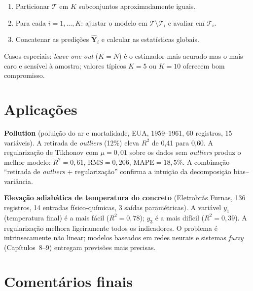\begin{enumerate}[leftmargin=1.2cm]
  \item Particionar $\mathcal{T}$ em $K$ subconjuntos
        aproximadamente iguais.
  \item Para cada $i=1,\dots,K$: ajustar o modelo em
        $\mathcal{T}\setminus\mathcal{T}_i$ e avaliar em
        $\mathcal{T}_i$.
  \item Concatenar as predições $\hat{\mathbf{Y}}_i$ e calcular as
        estatísticas globais.
\end{enumerate}

Casos especiais: \emph{leave-one-out} ($K=N$) é o estimador mais
acurado mas o mais caro e sensível à amostra; valores típicos $K=5$ ou
$K=10$ oferecem bom compromisso.

\section{Aplicações}

\begin{aplicacao}
\textbf{Pollution} (poluição do ar e mortalidade, EUA, 1959--1961, 60
registros, 15 variáveis). A retirada de \emph{outliers} (12\%) eleva
$R^2$ de 0{,}41 para 0{,}60. A regularização de Tikhonov com $\mu=0,01$
sobre os dados sem \emph{outliers} produz o melhor modelo:
$R^2=0{,}61$, $\mathrm{RMS}=0{,}206$, $\mathrm{MAPE}=18{,}5\%$. A
combinação ``retirada de \emph{outliers} + regularização'' confirma a
intuição da decomposição bias--variância.
\end{aplicacao}

\begin{aplicacao}
\textbf{Elevação adiabática de temperatura do concreto}
(Eletrobrás Furnas, 136 registros, 14 entradas físico-químicas, 3
saídas paramétricas). A variável $y_1$ (temperatura final) é a mais
fácil ($R^2=0{,}78$); $y_3$ é a mais difícil ($R^2=0{,}39$). A
regularização melhora ligeiramente todos os indicadores. O problema é
intrinsecamente não linear; modelos baseados em redes neurais e
sistemas \emph{fuzzy} (Capítulos~8--9) entregam previsões mais
precisas.
\end{aplicacao}

\section{Comentários finais}


